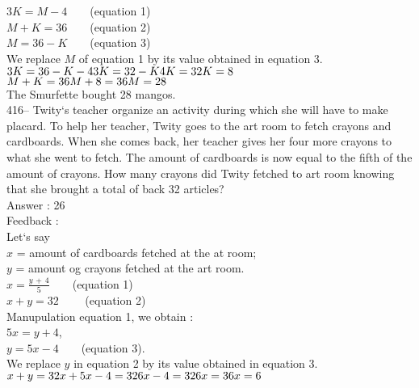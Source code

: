 \documentclass[letterpaper, 12pt]{article}
\begin{document}
$3K=M-4 \qquad $(equation 1)\\
$M+K=36 \qquad $(equation 2)\\

$M=36-K\qquad $(equation 3)\\

We replace $M$ of equation 1 by its value obtained in equation
3.\\
$3K=36-K-4\\
3K=32-K\\
4K=32\\
K=8$\\

$M+K=36\\
M+8=36\\
M=28$\\
The Smurfette bought 28 mangos.\\

416-- Twity`s teacher organize an activity during which she will have to make placard. To help her teacher, Twity goes to the art room to fetch crayons and cardboards. When she comes back, her teacher gives her four more crayons to what she went to fetch. The amount of cardboards is now equal to the fifth of the amount of crayons. How many crayons did Twity fetched to art room knowing that she brought a total of back 32 articles?\\

Answer : 26\\

Feedback : \\
Let`s say\\
$x$ = amount of cardboards fetched at the at room;\\
$y$ = amount og crayons fetched at the art room.\\

$x=\frac{y\,+\,4}{5}  \qquad $(equation 1)\\
$x+y=32 \qquad $ (equation 2)\\

Manupulation equation 1, we obtain : \\
$5x=y+4$,\\
$y=5x-4  \qquad $(equation 3).\\

We replace $y$ in equation 2 by its value obtained in equation
3.\\
$x+y=32\\
x+5x-4=32\\
6x-4=32\\
6x=36\\
x=6$\\
\end{document}
